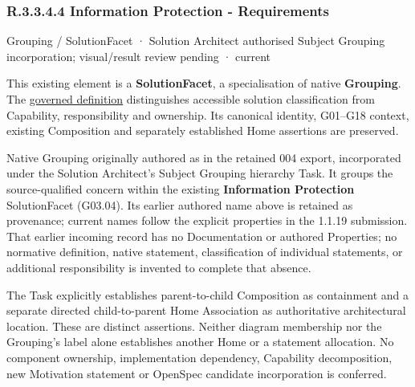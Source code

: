 \subsubsection*{R.3.3.4.4 Information Protection - Requirements}
\label{navigation:R.3.3.4.4}

\label{element:e84139e878c740ab81c558cbc7ec6548}
{\small Grouping / SolutionFacet · Solution Architect authorised Subject Grouping incorporation; visual/result review pending · current}\par

This existing element is a \textbf{SolutionFacet}, a specialisation of native
\textbf{Grouping}. The \href{\detokenize{../../../../../../../governance/continuum-representation.md#solutionfacet-classification--1119-candidate}}{governed definition}
distinguishes accessible solution classification from Capability, responsibility
and ownership. Its canonical identity, G01–G18 context, existing Composition
and separately established Home assertions are preserved.



Native Grouping originally authored as \texttt{} in the retained 004 export,
incorporated under the Solution Architect's Subject Grouping hierarchy Task.
It groups the source-qualified \texttt{} concern within
the existing \textbf{Information Protection} SolutionFacet (G03.04). Its earlier authored name above is retained as provenance; current names
follow the explicit properties in the 1.1.19 submission.
That earlier incoming record has no Documentation or authored Properties; no normative
definition, native statement, classification of individual statements, or
additional responsibility is invented to complete that absence.



The Task explicitly establishes parent-to-child Composition as containment and
a separate directed child-to-parent Home Association as authoritative architectural
location. These are distinct assertions. Neither diagram membership nor the
Grouping's label alone establishes another Home or a statement allocation.
No component ownership, implementation dependency, Capability decomposition,
new Motivation statement or OpenSpec candidate incorporation is conferred.



